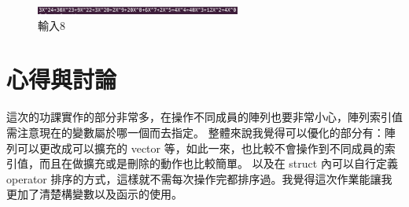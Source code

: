 \documentclass[12pt, a4paper]{article}
\begin{document}
        \begin{figure}
          \centering
          \includegraphics[width=0.6\textwidth]{./image/Mult.png}
          \caption{輸入8}
        \end{figure}


      \normalsize

  \section{\fontsize{20pt}{22pt}\selectfont 心得與討論}
  \begin{samepage}
    \fontsize{16pt}{18pt} \selectfont
      這次的功課實作的部分非常多，在操作不同成員的陣列也要非常小心，陣列索引值需注意現在的變數屬於哪一個而去指定。
      整體來說我覺得可以優化的部分有：陣列可以更改成可以擴充的 vector 等，如此一來，也比較不會操作到不同成員的索引值，而且在做擴充或是刪除的動作也比較簡單。
      以及在 struct 內可以自行定義 operator 排序的方式，這樣就不需每次操作完都排序過。我覺得這次作業能讓我更加了清楚構變數以及函示的使用。
    \normalfont
  \end{samepage}
\end{document}
